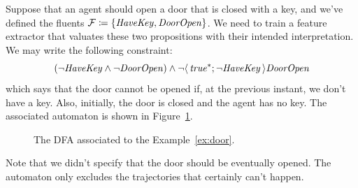\begin{example}
	Suppose that an agent should open a door that is closed with a key, and
	we've defined the fluents $\mathcal{F} \coloneqq \{\text{\textit{HaveKey}},
	\text{\textit{DoorOpen}}\}$. We need to train a feature extractor that valuates these
	two propositions with their intended interpretation. We may write the
	following constraint:
	\[
		(\neg \text{\textit{HaveKey}} \land \neg \text{\textit{DoorOpen}})
		\land \neg \langle\, {\text{\textit{true}}^*; \neg \text{\textit{HaveKey}}} \,\rangle\text{\textit{DoorOpen}}
	\]
	which says that the door cannot be opened if, at the previous instant, we
	don't have a key. Also, initially, the door is closed and the agent has no
	key.  The associated automaton is shown in Figure~\ref{fig:door-automa}.
	\begin{figure}[tb]
			\centering
			\caption{The DFA associated to the Example~\ref{ex:door}.}
			\label{fig:door-automa}
	\end{figure}
	Note that we didn't specify that the door should be eventually opened. The
	automaton only excludes the trajectories that certainly can't happen.
	\label{ex:door}
\end{example}

